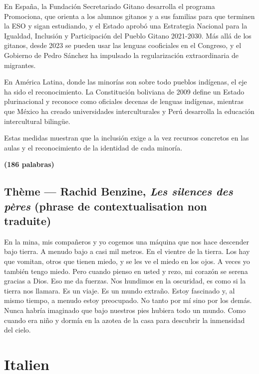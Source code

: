 \documentclass[11pt,a4paper]{article}
\begin{document}
En España, la Fundación Secretariado Gitano desarrolla el programa Promociona, que orienta a los alumnos gitanos y a sus familias para que terminen la ESO y sigan estudiando, y el Estado aprobó una Estrategia Nacional para la Igualdad, Inclusión y Participación del Pueblo Gitano 2021-2030. Más allá de los gitanos, desde 2023 se pueden usar las lenguas cooficiales en el Congreso, y el Gobierno de Pedro Sánchez ha impulsado la regularización extraordinaria de migrantes.

En América Latina, donde las minorías son sobre todo pueblos indígenas, el eje ha sido el reconocimiento. La Constitución boliviana de 2009 define un Estado plurinacional y reconoce como oficiales decenas de lenguas indígenas, mientras que México ha creado universidades interculturales y Perú desarrolla la educación intercultural bilingüe.

Estas medidas muestran que la inclusión exige a la vez recursos concretos en las aulas y el reconocimiento de la identidad de cada minoría.

\textbf{(186 palabras)}

\hypertarget{thuxe8me-rachid-benzine-les-silences-des-puxe8res-phrase-de-contextualisation-non-traduite}{%
\subsection{\texorpdfstring{Thème --- Rachid Benzine, \emph{Les silences des pères} (phrase de contextualisation non traduite)}{Thème --- Rachid Benzine, Les silences des pères (phrase de contextualisation non traduite)}}\label{thuxe8me-rachid-benzine-les-silences-des-puxe8res-phrase-de-contextualisation-non-traduite}}

En la mina, mis compañeros y yo cogemos una máquina que nos hace descender bajo tierra. A menudo bajo a casi mil metros. En el vientre de la tierra. Los hay que vomitan, otros que tienen miedo, y se les ve el miedo en los ojos. A veces yo también tengo miedo. Pero cuando pienso en usted y rezo, mi corazón se serena gracias a Dios. Eso me da fuerzas. Nos hundimos en la oscuridad, es como si la tierra nos llamara. Es un viaje. Es un mundo extraño. Estoy fascinado y, al mismo tiempo, a menudo estoy preocupado. No tanto por mí sino por los demás. Nunca habría imaginado que bajo nuestros pies hubiera todo un mundo. Como cuando era niño y dormía en la azotea de la casa para descubrir la inmensidad del cielo.

\hypertarget{italien}{%
\section{Italien}\label{italien}}
\end{document}
